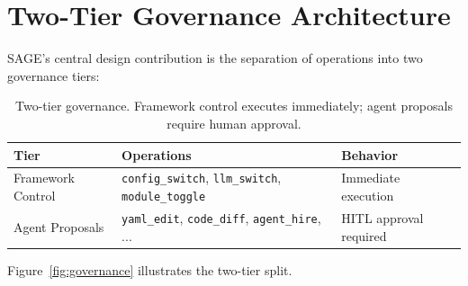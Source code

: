 \documentclass[11pt,a4paper]{article}
\begin{document}
\section{Two-Tier Governance Architecture}
\label{sec:governance}

SAGE's central design contribution is the separation of operations into two governance tiers:

\begin{table}[h]
\centering
\caption{Two-tier governance. Framework control executes immediately; agent proposals require human approval.}
\label{tab:governance}
\begin{tabular}{lll}
\toprule
\textbf{Tier} & \textbf{Operations} & \textbf{Behavior} \\
\midrule
Framework Control & \texttt{config\_switch}, \texttt{llm\_switch}, \texttt{module\_toggle} & Immediate execution \\
Agent Proposals & \texttt{yaml\_edit}, \texttt{code\_diff}, \texttt{agent\_hire}, ... & HITL approval required \\
\bottomrule
\end{tabular}
\end{table}

Figure~\ref{fig:governance} illustrates the two-tier split.
\end{document}
